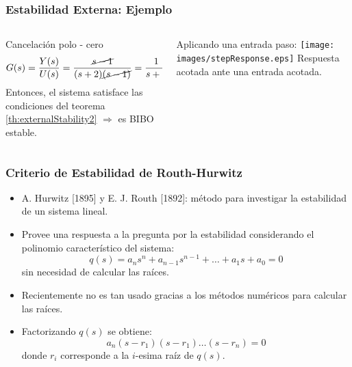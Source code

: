 \documentclass[aspectratio=169]{beamer}
\theoremstyle{definition}
\theoremstyle{plain}
\theoremstyle{remark}
\begin{document}
\begin{frame}[<+->][fragile]\frametitle{Estabilidad Externa: Ejemplo}
\vspace*{5mm}
\begin{columns}
\begin{column}{0.5\textwidth}
Cancelación polo - cero
\begin{equation*}
	G(s) = \frac{Y(s)}{U(s)} = \frac{\cancel{s-1}}{(s+2)\cancel{(s-1)}} = \frac{1}{s+2}
\end{equation*}
\pause
Entonces, el sistema satisface las condiciones del teorema \ref{th:externalStability2} $\Rightarrow$ es BIBO estable.
\end{column}	
\begin{column}{0.5\textwidth}
Aplicando una entrada paso:
\centering
\texttt{[image: images/stepResponse.eps]}
Respuesta acotada ante una entrada acotada.
\end{column}	
\end{columns}
\end{frame}

\begin{frame}[<+->]\frametitle{Criterio de Estabilidad de Routh-Hurwitz}
\begin{itemize}
	\item A. Hurwitz [1895] y E. J. Routh [1892]: método para investigar la estabilidad de un sistema lineal.
	\item Provee una respuesta a la pregunta por la estabilidad considerando el polinomio característico del sistema:
	\begin{equation*}
		q(s) = a_n s^n + a_{n-1} s^{n-1} + \dots + a_1 s + a_0 = 0
	\end{equation*}
	sin necesidad de calcular las raíces.
	\item Recientemente no es tan usado gracias a los métodos numéricos para calcular las raíces.
	\item Factorizando $q(s)$ se obtiene:
	\begin{equation*}
		a_n (s-r_1) (s-r_1) \dots (s-r_n) = 0
	\end{equation*}
	donde $r_i$ corresponde a la $i$-esima raíz de $q(s)$.
\end{itemize}
\end{frame}
\end{document}
